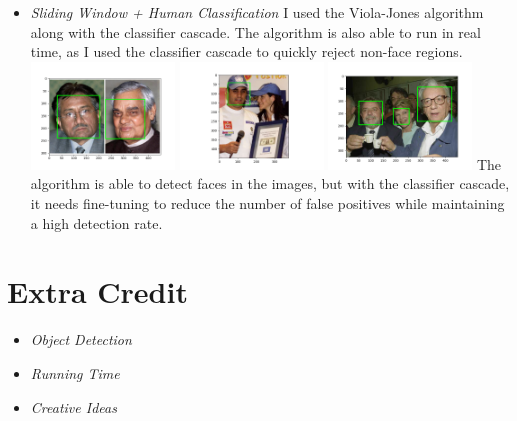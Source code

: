 \documentclass[11pt]{article}
\begin{document}
\begin{itemize}
        \item \textit{Sliding Window + Human Classification}\newline
        I used the Viola-Jones algorithm along with the classifier cascade. The algorithm is also
        able to run in real time, as I used the classifier cascade to quickly reject non-face
        regions.\newline
        \includegraphics[width=0.3\textwidth]{Output Pictures/ex_1}
        \includegraphics[width=0.3\textwidth]{Output Pictures/ex_2}
        \includegraphics[width=0.3\textwidth]{Output Pictures/ex_3}
        The algorithm is able to detect faces in the images, but with the classifier cascade, it
        needs fine-tuning to reduce the number of false positives while maintaining a high detection
        rate.\newline

    \end{itemize}


    \section{Extra Credit}

    \begin{itemize}
        \item \textit{Object Detection}

        \item \textit{Running Time}

        \item \textit{Creative Ideas}

    \end{itemize}
\end{document}
